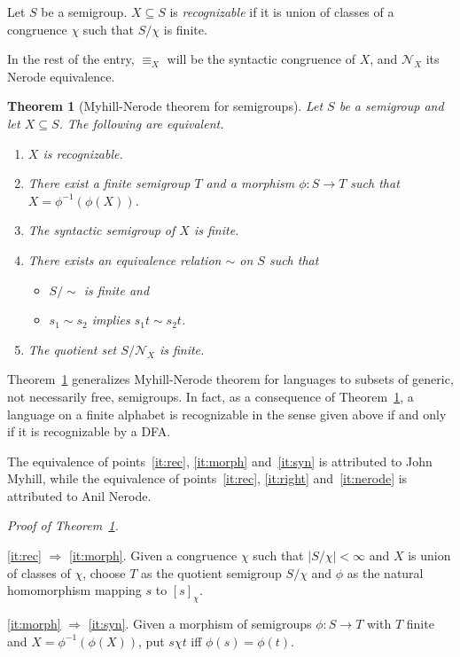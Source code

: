 \documentclass[12pt]{article}
\begin{document}
\newtheorem{theorem}{Theorem}

Let $S$ be a semigroup.
$X\subseteq S$ is \emph{recognizable}
if it is union of classes of a congruence $\chi$
such that $S/\chi$ is finite.

In the rest of the entry,
$\equiv_X$ will be the syntactic congruence of $X$,
and $\mathcal{N}_X$ its Nerode equivalence.
\begin{theorem}[Myhill-Nerode theorem for semigroups] \label{thm:mn}
Let $S$ be a semigroup and let $X\subseteq S$.
The following are equivalent.
\begin{enumerate}
\item \label{it:rec}
$X$ is recognizable.
\item \label{it:morph}
There exist a finite semigroup $T$ and a morphism $\phi:S\to T$
such that $X=\phi^{-1}(\phi(X))$.
\item \label{it:syn}
The syntactic semigroup of $X$ is finite.
\item \label{it:right}
There exists an equivalence relation $\sim$ on $S$ such that
\begin{itemize}
\item $S/\sim$ is finite and
\item $s_1\sim s_2$ implies $s_1t\sim s_2t$.
\end{itemize}
\item \label{it:nerode}
The quotient set $S/\mathcal{N}_X$ is finite.
\end{enumerate}
\end{theorem}
Theorem~\ref{thm:mn} generalizes Myhill-Nerode theorem for languages
to subsets of generic, not necessarily free, semigroups.
In fact, as a consequence of Theorem~\ref{thm:mn},
a language on a finite alphabet is recognizable in the sense given above
if and only if it is recognizable by a DFA.

The equivalence of points~\ref{it:rec}, \ref{it:morph} and~\ref{it:syn}
is attributed to John Myhill,
while the equivalence of points~\ref{it:rec}, \ref{it:right} and~\ref{it:nerode}
is attributed to Anil Nerode.

\emph{Proof of Theorem~\ref{thm:mn}.}

\ref{it:rec} $\Rightarrow$ \ref{it:morph}.
Given a congruence $\chi$ such that
$|S/\chi|<\infty$ and $X$ is union of classes of $\chi$,
choose $T$ as the quotient semigroup $S/\chi$
and $\phi$ as the natural homomorphism mapping $s$ to $[s]_\chi$.

\ref{it:morph} $\Rightarrow$ \ref{it:syn}.
Given a morphism of semigroups $\phi:S\to T$
with $T$ finite and $X=\phi^{-1}(\phi(X))$,
put $s\chi t$ iff $\phi(s)=\phi(t)$.
\end{document}
